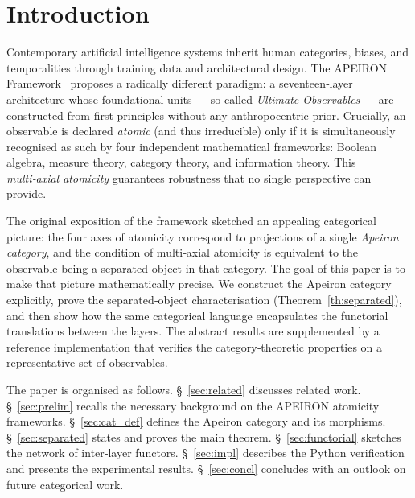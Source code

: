 \section{Introduction}\label{sec:intro}
Contemporary artificial intelligence systems inherit human categories, biases, and temporalities through training data and architectural design.
The APEIRON Framework~\cite{Beniers2026Apeiron} proposes a radically different paradigm: a seventeen‑layer architecture whose foundational units --- so‑called \emph{Ultimate Observables} --- are constructed from first principles without any anthropocentric prior.
Crucially, an observable is declared \emph{atomic} (and thus irreducible) only if it is simultaneously recognised as such by four independent mathematical frameworks: Boolean algebra, measure theory, category theory, and information theory.
This \emph{multi‑axial atomicity} guarantees robustness that no single perspective can provide.

The original exposition of the framework sketched an appealing categorical picture: the four axes of atomicity correspond to projections of a single \emph{Apeiron category}, and the condition of multi‑axial atomicity is equivalent to the observable being a separated object in that category.
The goal of this paper is to make that picture mathematically precise.
We construct the Apeiron category explicitly, prove the separated‑object characterisation (Theorem~\ref{th:separated}), and then show how the same categorical language encapsulates the functorial translations between the layers.
The abstract results are supplemented by a reference implementation that verifies the category‑theoretic properties on a representative set of observables.

The paper is organised as follows.
\S~\ref{sec:related} discusses related work.
\S~\ref{sec:prelim} recalls the necessary background on the APEIRON atomicity frameworks.
\S~\ref{sec:cat_def} defines the Apeiron category and its morphisms.
\S~\ref{sec:separated} states and proves the main theorem.
\S~\ref{sec:functorial} sketches the network of inter‑layer functors.
\S~\ref{sec:impl} describes the Python verification and presents the experimental results.
\S~\ref{sec:concl} concludes with an outlook on future categorical work.